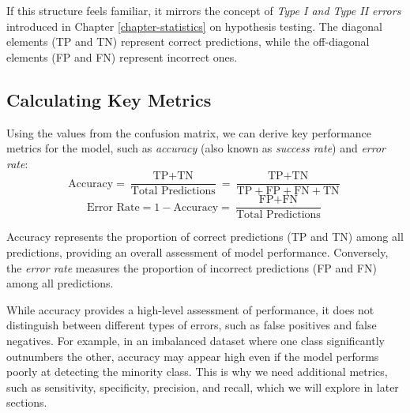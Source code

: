 \documentclass[
  11pt,
]{book}
\theoremstyle{definition}
\theoremstyle{definition}
\theoremstyle{definition}
\theoremstyle{definition}
\theoremstyle{remark}
\begin{document}
If this structure feels familiar, it mirrors the concept of \emph{Type I and Type II errors} introduced in Chapter \ref{chapter-statistics} on hypothesis testing. The diagonal elements (TP and TN) represent correct predictions, while the off-diagonal elements (FP and FN) represent incorrect ones.

\subsection*{Calculating Key Metrics}\label{calculating-key-metrics}


Using the values from the confusion matrix, we can derive key performance metrics for the model, such as \emph{accuracy} (also known as \emph{success rate}) and \emph{error rate}:
\[
\text{Accuracy} = \frac{\text{TP} + \text{TN}}{\text{Total Predictions}} = \frac{\text{TP} + \text{TN}}{\text{TP} + \text{FP} + \text{FN} + \text{TN}}
\]
\[
\text{Error Rate} = 1 - \text{Accuracy} = \frac{\text{FP} + \text{FN}}{\text{Total Predictions}}
\]

Accuracy represents the proportion of correct predictions (TP and TN) among all predictions, providing an overall assessment of model performance. Conversely, the \emph{error rate} measures the proportion of incorrect predictions (FP and FN) among all predictions.

While accuracy provides a high-level assessment of performance, it does not distinguish between different types of errors, such as false positives and false negatives. For example, in an imbalanced dataset where one class significantly outnumbers the other, accuracy may appear high even if the model performs poorly at detecting the minority class. This is why we need additional metrics, such as sensitivity, specificity, precision, and recall, which we will explore in later sections.
\end{document}
